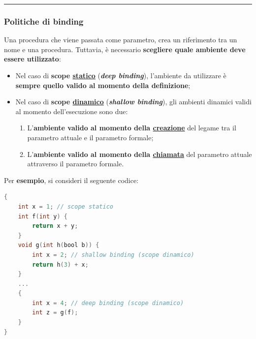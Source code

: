 \documentclass[a4paper]{article}
\newcommand{\longline}{\noindent\rule{\textwidth}{0.4pt}}
\begin{document}
	\longline
	
	\subsubsection{Politiche di binding}
	
	Una procedura che viene passata come parametro, crea un riferimento tra un nome e una procedura. Tuttavia, è necessario \textbf{scegliere quale ambiente deve essere utilizzato}:
	\begin{itemize}
		\item Nel caso di \textbf{scope \underline{statico}} (\textbf{\emph{deep binding}}), l'ambiente da utilizzare è \textbf{sempre quello valido al momento della definizione};
		
		\item Nel caso di \textbf{scope \underline{dinamico}} (\textbf{\emph{shallow binding}}), gli ambienti dinamici validi al momento dell'esecuzione sono due:
		\begin{enumerate}
			\item L'\textcolor{Red3}{\textbf{ambiente valido al momento della \underline{creazione}}} del legame tra il parametro attuale e il parametro formale;
			
			\item L'\textcolor{Red3}{\textbf{ambiente valido al momento della \underline{chiamata}}} del parametro attuale attraverso il parametro formale.
		\end{enumerate}
	\end{itemize}
	Per \textcolor{Green4}{\textbf{esempio}}, si consideri il seguente codice:
	\begin{lstlisting}[language=C]
{
	int x = 1; // scope statico
	int f(int y) {
		return x + y;
	}
	void g(int h(bool b)) {
		int x = 2; // shallow binding (scope dinamico)
		return h(3) + x;
	}
	...
	{
		int x = 4; // deep binding (scope dinamico)
		int z = g(f);
	}
}\end{lstlisting}\newpage
\end{document}
